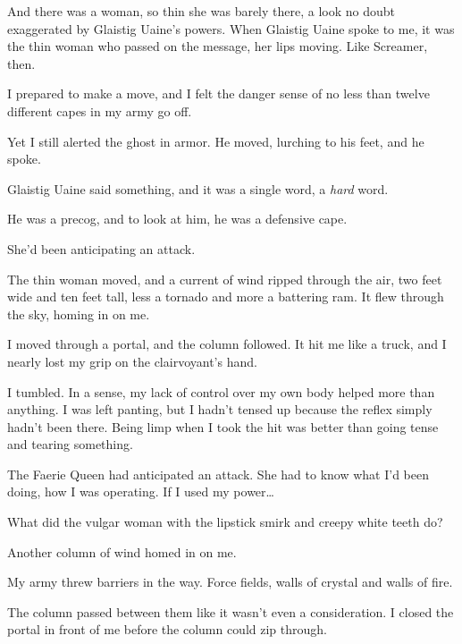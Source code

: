 And there was a woman, so thin she was barely there, a look no doubt exaggerated by Glaistig Uaine's powers.  When Glaistig Uaine spoke to me, it was the thin woman who passed on the message, her lips moving.  Like Screamer, then.



I prepared to make a move, and I felt the danger sense of no less than twelve different capes in my army go off.



Yet I still alerted the ghost in armor.  He moved, lurching to his feet, and he spoke.



Glaistig Uaine said something, and it was a single word, a \emph{hard }word.



He was a precog, and to look at him, he was a defensive cape.



She'd been anticipating an attack.



The thin woman moved, and a current of wind ripped through the air, two feet wide and ten feet tall, less a tornado and more a battering ram.  It flew through the sky, homing in on me.



I moved through a portal, and the column followed.  It hit me like a truck, and I nearly lost my grip on the clairvoyant's hand.



I tumbled.  In a sense, my lack of control over my own body helped more than anything.  I was left panting, but I hadn't tensed up because the reflex simply hadn't been there.  Being limp when I took the hit was better than going tense and tearing something.



The Faerie Queen had anticipated an attack.  She had to know what I'd been doing, how I was operating.  If I used my power\ldots



What did the vulgar woman with the lipstick smirk and creepy white teeth do?



Another column of wind homed in on me.



My army threw barriers in the way.  Force fields, walls of crystal and walls of fire.



The column passed between them like it wasn't even a consideration.  I closed the portal in front of me before the column could zip through.



